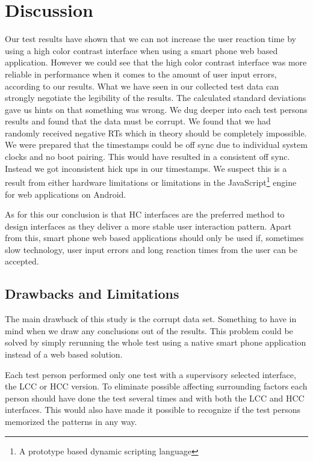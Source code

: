 \documentclass[runningheads,a4paper]{llncs}
\begin{document}
\section{Discussion}\label{sec:discussion}
Our test results have shown that we can not increase the user reaction time by using a high color contrast interface when using a smart phone web based application. However we could see that the high color contrast interface was more reliable in performance when it comes to the amount of user input errors, according to our results. What we have seen in our collected test data can strongly negotiate the legibility of the results. The calculated standard deviations gave us hints on that something was wrong. We dug deeper into each test persons results and found that the data must be corrupt. We found that we had randomly received negative RTs which in theory should be completely impossible. We were prepared that the timestamps could be off sync due to individual system clocks and no boot pairing. This would have resulted in a consistent off sync. Instead we got inconsistent hick ups in our timestamps. We suspect this is a result from either hardware limitations or limitations in the JavaScript\footnote{A prototype based dynamic scripting language} engine for web applications on Android.

As for this our conclusion is that HC interfaces are the preferred method to design interfaces as they deliver a more stable user interaction pattern. Apart from this, smart phone web based applications should only be used if, sometimes slow technology, user input errors and long reaction times from the user can be accepted.

\subsection{Drawbacks and Limitations}\label{subsec:drawbacks}
The main drawback of this study is the corrupt data set. Something to have in mind when we draw any conclusions out of the results. This problem could be solved by simply rerunning the whole test using a native smart phone application instead of a web based solution.

Each test person performed only one test with a supervisory selected interface, the LCC or HCC version. To eliminate possible affecting surrounding factors each person should have done the test several times and with both the LCC and HCC interfaces. This would also have made it possible to recognize if the test persons memorized the patterns in any way.
\end{document}
